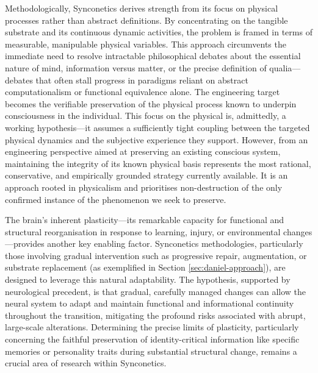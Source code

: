 \documentclass[10pt]{article}
\begin{document}
\begin{sloppypar}
  Methodologically, Synconetics derives strength from its focus on physical processes rather than abstract definitions. By concentrating on the tangible substrate and its continuous dynamic activities, the problem is framed in terms of measurable, manipulable physical variables. This approach circumvents the immediate need to resolve intractable philosophical debates about the essential nature of mind, information versus matter, or the precise definition of qualia—debates that often stall progress in paradigms reliant on abstract computationalism or functional equivalence alone. The engineering target becomes the verifiable preservation of the physical process known to underpin consciousness in the individual. This focus on the physical is, admittedly, a working hypothesis—it assumes a sufficiently tight coupling between the targeted physical dynamics and the subjective experience they support. However, from an engineering perspective aimed at preserving an existing conscious system, maintaining the integrity of its known physical basis represents the most rational, conservative, and empirically grounded strategy currently available. It is an approach rooted in physicalism and prioritises non-destruction of the only confirmed instance of the phenomenon we seek to preserve.

  The brain's inherent plasticity—its remarkable capacity for functional and structural reorganisation in response to learning, injury, or environmental changes—provides another key enabling factor. Synconetics methodologies, particularly those involving gradual intervention such as progressive repair, augmentation, or substrate replacement (as exemplified in Section \ref{sec:daniel-approach}), are designed to leverage this natural adaptability. The hypothesis, supported by neurological precedent, is that gradual, carefully managed changes can allow the neural system to adapt and maintain functional and informational continuity throughout the transition, mitigating the profound risks associated with abrupt, large-scale alterations. Determining the precise limits of plasticity, particularly concerning the faithful preservation of identity-critical information like specific memories or personality traits during substantial structural change, remains a crucial area of research within Synconetics.


\end{sloppypar}
\end{document}
